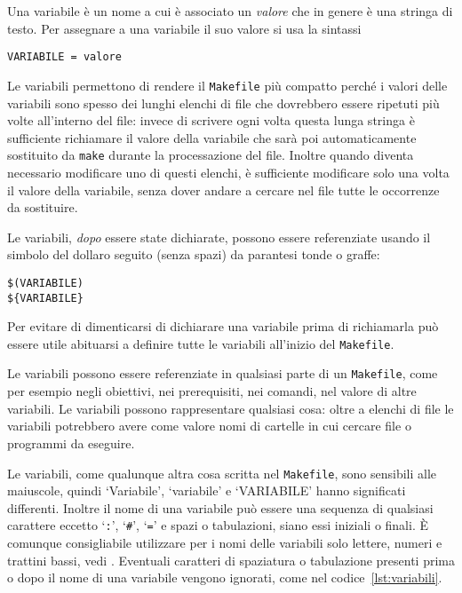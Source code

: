 Una variabile è un nome a cui è associato un \emph{valore} che in genere è una
stringa di testo.  Per assegnare a una variabile il suo valore si usa la
sintassi
\begin{lstlisting}
VARIABILE = valore
\end{lstlisting}
Le variabili permettono di rendere il \verb|Makefile| più compatto perché i
valori delle variabili sono spesso dei lunghi elenchi di file che dovrebbero
essere ripetuti più volte all'interno del file: invece di scrivere ogni volta
questa lunga stringa è sufficiente richiamare il valore della variabile che sarà
poi automaticamente sostituito da \verb|make| durante la processazione del file.
Inoltre quando diventa necessario modificare uno di questi elenchi, è
sufficiente modificare solo una volta il valore della variabile, senza dover
andare a cercare nel file tutte le occorrenze da sostituire.

Le variabili, \emph{dopo} essere state dichiarate, possono essere referenziate
usando il simbolo del dollaro seguito (senza spazi) da parantesi tonde o graffe:
\begin{lstlisting}
$(VARIABILE)
${VARIABILE}
\end{lstlisting}
Per evitare di dimenticarsi di dichiarare una variabile prima di richiamarla può
essere utile abituarsi a definire tutte le variabili all'inizio del
\verb|Makefile|.

Le variabili possono essere referenziate in qualsiasi parte di un
\verb|Makefile|, come per esempio negli obiettivi, nei prerequisiti, nei
comandi, nel valore di altre variabili.  Le variabili possono rappresentare
qualsiasi cosa: oltre a elenchi di file le variabili potrebbero avere come
valore nomi di cartelle in cui cercare file o programmi da eseguire.

Le variabili, come qualunque altra cosa scritta nel \verb|Makefile|, sono
sensibili alle maiuscole, quindi `Variabile', `variabile' e `VARIABILE' hanno
significati differenti.  Inoltre il nome di una variabile può essere una
sequenza di qualsiasi carattere eccetto `\verb|:|', `\verb|#|', `\verb|=|' e
spazi o tabulazioni, siano essi iniziali o finali.  È comunque consigliabile
utilizzare per i nomi delle variabili solo lettere, numeri e trattini bassi,
vedi \textcite[57]{gnu:make}.  Eventuali caratteri di spaziatura o tabulazione
presenti prima o dopo il nome di una variabile vengono ignorati, come nel
codice~\ref{lst:variabili}.

